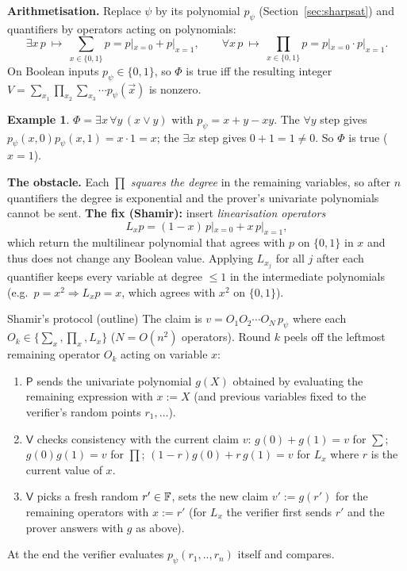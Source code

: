 \documentclass[11pt,a4paper]{report}
\theoremstyle{plain}
\theoremstyle{definition}
\newtheorem{example}[theorem]{Example}
\theoremstyle{remark}
\newcommand{\Prv}{\mathsf{P}}\newcommand{\Ver}{\mathsf{V}}
\begin{document}
\textbf{Arithmetisation.} Replace $\psi$ by its polynomial $p_\psi$ (Section~\ref{sec:sharpsat}) and quantifiers by operators acting on polynomials:
\[\exists x\,p\ \mapsto\ \textstyle\sum_{x\in\{0,1\}}p=p|_{x=0}+p|_{x=1},\qquad \forall x\,p\ \mapsto\ \prod_{x\in\{0,1\}}p=p|_{x=0}\cdot p|_{x=1}.\]
On Boolean inputs $p_\psi\in\{0,1\}$, so $\Phi$ is true iff the resulting integer $V=\sum_{x_1}\prod_{x_2}\sum_{x_3}\cdots p_\psi(\vec x)$ is nonzero.
\begin{example}
$\Phi=\exists x\,\forall y\,(x\vee y)$ with $p_\psi=x+y-xy$. The $\forall y$ step gives $p_\psi(x,0)p_\psi(x,1)=x\cdot1=x$; the $\exists x$ step gives $0+1=1\ne0$. So $\Phi$ is true ($x=1$).
\end{example}
\textbf{The obstacle.} Each $\prod$ \emph{squares the degree} in the remaining variables, so after $n$ quantifiers the degree is exponential and the prover's univariate polynomials cannot be sent. \textbf{The fix (Shamir):} insert \emph{linearisation operators}
\[L_xp=(1-x)\,p|_{x=0}+x\,p|_{x=1},\]
which return the multilinear polynomial that agrees with $p$ on $\{0,1\}$ in $x$ and thus does not change any Boolean value. Applying $L_{x_j}$ for all $j$ after each quantifier keeps every variable at degree $\le 1$ in the intermediate polynomials (e.g.\ $p=x^2\Rightarrow L_xp=x$, which agrees with $x^2$ on $\{0,1\}$).
\begin{protocol}[label=pr:shamir]{Shamir's protocol (outline)}
The claim is $v=O_1O_2\cdots O_N\,p_\psi$ where each $O_k\in\{\sum_{x},\prod_{x},L_{x}\}$ ($N=O(n^2)$ operators). Round $k$ peels off the leftmost remaining operator $O_k$ acting on variable $x$:
\begin{enumerate}
\item $\Prv$ sends the univariate polynomial $g(X)$ obtained by evaluating the remaining expression with $x:=X$ (and previous variables fixed to the verifier's random points $r_1,\dots$).
\item $\Ver$ checks consistency with the current claim $v$: $g(0)+g(1)=v$ for $\sum$; $g(0)g(1)=v$ for $\prod$; $(1-r)g(0)+r\,g(1)=v$ for $L_x$ where $r$ is the current value of $x$.
\item $\Ver$ picks a fresh random $r'\in\mathbb{F}$, sets the new claim $v':=g(r')$ for the remaining operators with $x:=r'$ (for $L_x$ the verifier first sends $r'$ and the prover answers with $g$ as above).
\end{enumerate}
At the end the verifier evaluates $p_\psi(r_1,..,r_n)$ itself and compares.
\end{protocol}
\end{document}
